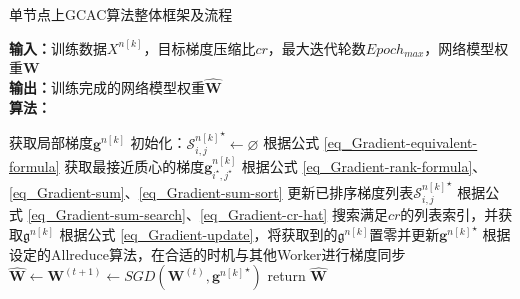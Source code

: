 \documentclass{xdupgthesis}
\begin{document}
\renewcommand{\arraystretch}{1.3}
\begin{algorithm}[ht]
    \caption{单节点上GCAC算法整体框架及流程}
    \label{alg_GCC}
    \raggedright
    \hspace*{0.02in} \textbf{输入：}训练数据$X^{n[k]}$，目标梯度压缩比$cr$，最大迭代轮数$Epoch_{max}$，网络模型权重$\mathbf{W}$ \\
    \hspace*{0.02in} \textbf{输出：}训练完成的网络模型权重$\mathbf{\hat{W}}$ \\
    \hspace*{0.02in} \textbf{算法：} 
    \begin{algorithmic}[1]
            \State 获取局部梯度$\mathbf{g}^{n[k]}$
                \State 初始化：${\mathcal{S}_{i, j}^{n[k]}}^{\star} \leftarrow \varnothing$
                \State 根据公式 \eqref{eq_Gradient-equivalent-formula} 获取最接近质心的梯度$\mathbf{g}_{i^{\star}, j^{\star}}^{n[k]}$
                \State 根据公式 \eqref{eq_Gradient-rank-formula}、\eqref{eq_Gradient-sum}、\eqref{eq_Gradient-sum-sort} 更新已排序梯度列表${\mathcal{S}_{i, j}^{n[k]}}^{\star}$
                \State 根据公式 \eqref{eq_Gradient-sum-search}、\eqref{eq_Gradient-cr-hat} 搜索满足$cr$的列表索引，并获取$\mathfrak{g}^{n[k]}$
                \State 根据公式 \eqref{eq_Gradient-update}，将获取到的$\mathfrak{g}^{n[k]}$置零并更新${\mathbf{g}^{n[k]}}^{\star}$
            \EndFor
            \State 根据设定的Allreduce算法，在合适的时机与其他Worker进行梯度同步
            \State $\mathbf{\hat{W}} \leftarrow \mathbf{W}^{(t+1)} \leftarrow SGD\left( \mathbf{W}^{(t)}, {\mathbf{g}^{n[k]}}^{\star} \right)$
        \EndFor
        \State return $\mathbf{\hat{W}}$
    \end{algorithmic}
\end{algorithm}
\end{document}
